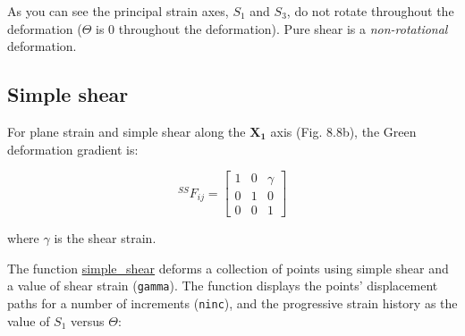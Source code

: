 \documentclass[a4paper , 12pt]{book}
\newcommand{\code}[1]{\colorbox{light-gray}{\texttt{#1}}}
\begin{document}
As you can see the principal strain axes, $S_1$ and $S_3$, do not rotate throughout the deformation ($\Theta$ is 0 throughout the deformation). Pure shear is a \textit{non-rotational} deformation.

\subsection{Simple shear}

For plane strain and simple shear along the $\mathbf{X_1}$ axis (Fig. 8.8b), the Green deformation gradient is:

\begin{equation}
    { }^{SS}F_{i j}=\left[\begin{array}{lll}1 & 0 & \gamma \\ 0 & 1 & 0 \\ 0 & 0 & 1\end{array}\right]
\end{equation}

where $\gamma$ is the shear strain.

The function \href{https://github.com/nfcd/compGeo/blob/master/source/functions/simple_shear.py}{simple\_shear} deforms a collection of points using simple shear and a value of shear strain (\code{gamma}). The function displays the points' displacement paths for a number of increments (\code{ninc}), and the progressive strain history as the value of $S_1$ versus $\Theta$:
\end{document}
